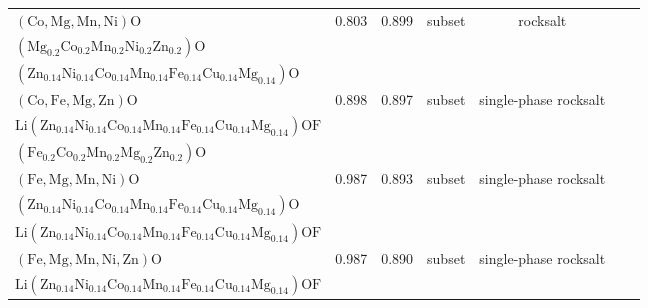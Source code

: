 \begin{table}
{\begin{tabular}{lcccccr}
$(\mathrm{Co},\mathrm{Mg},\mathrm{Mn},\mathrm{Ni})\mathrm{O}$ & 0.803 & 0.899 & subset & rocksalt & \makecell{$(\mathrm{Co},\mathrm{Fe},\mathrm{Mg},\mathrm{Mn},\mathrm{Ni})\mathrm{O}$\\
$(\mathrm{Mg}_{0.2}\mathrm{Co}_{0.2}\mathrm{Mn}_{0.2}\mathrm{Ni}_{0.2}\mathrm{Zn}_{0.2})\mathrm{O}$\\
$(\mathrm{Zn}_{0.14}\mathrm{Ni}_{0.14}\mathrm{Co}_{0.14}\mathrm{Mn}_{0.14}\mathrm{Fe}_{0.14}\mathrm{Cu}_{0.14}\mathrm{Mg}_{0.14})\mathrm{O}$}& ~\cite{Sivak_HighEntropy_PhysicalReviewLetters_2025,Hou_ReversibilityAnodes_NanoEnergy_2024,Lin_MechanochemicalSynthesis_JournalofMaterialsScience_2020} \\
$(\mathrm{Co},\mathrm{Fe},\mathrm{Mg},\mathrm{Zn})\mathrm{O}$ & 0.898 & 0.897 & subset & single-phase rocksalt & \makecell{$(\mathrm{Zn}_{0.14}\mathrm{Ni}_{0.14}\mathrm{Co}_{0.14}\mathrm{Mn}_{0.14}\mathrm{Fe}_{0.14}\mathrm{Cu}_{0.14}\mathrm{Mg}_{0.14})\mathrm{O}$\\
$\mathrm{Li}(\mathrm{Zn}_{0.14}\mathrm{Ni}_{0.14}\mathrm{Co}_{0.14}\mathrm{Mn}_{0.14}\mathrm{Fe}_{0.14}\mathrm{Cu}_{0.14}\mathrm{Mg}_{0.14})\mathrm{OF}$\\
$(\mathrm{Fe}_{0.2}\mathrm{Co}_{0.2}\mathrm{Mn}_{0.2}\mathrm{Mg}_{0.2}\mathrm{Zn}_{0.2})\mathrm{O}$} & ~\cite{Lin_MechanochemicalSynthesis_JournalofMaterialsScience_2020,Dey_RocksaltNanocrystals_JournaloftheAmericanChemicalSociety_2025} \\
$(\mathrm{Fe},\mathrm{Mg},\mathrm{Mn},\mathrm{Ni})\mathrm{O}$ & 0.987 & 0.893 & subset & single-phase rocksalt & \makecell{$(\mathrm{Co},\mathrm{Fe},\mathrm{Mg},\mathrm{Mn},\mathrm{Ni})\mathrm{O}$\\
$(\mathrm{Zn}_{0.14}\mathrm{Ni}_{0.14}\mathrm{Co}_{0.14}\mathrm{Mn}_{0.14}\mathrm{Fe}_{0.14}\mathrm{Cu}_{0.14}\mathrm{Mg}_{0.14})\mathrm{O}$\\
$\mathrm{Li}(\mathrm{Zn}_{0.14}\mathrm{Ni}_{0.14}\mathrm{Co}_{0.14}\mathrm{Mn}_{0.14}\mathrm{Fe}_{0.14}\mathrm{Cu}_{0.14}\mathrm{Mg}_{0.14})\mathrm{OF}$} &  ~\cite{Sivak_HighEntropy_PhysicalReviewLetters_2025,Lin_MechanochemicalSynthesis_JournalofMaterialsScience_2020,pu2023mg} \\
$(\mathrm{Fe},\mathrm{Mg},\mathrm{Mn},\mathrm{Ni},\mathrm{Zn})\mathrm{O}$ & 0.987 & 0.890 & subset & single-phase rocksalt & \makecell{$(\mathrm{Zn}_{0.14}\mathrm{Ni}_{0.14}\mathrm{Co}_{0.14}\mathrm{Mn}_{0.14}\mathrm{Fe}_{0.14}\mathrm{Cu}_{0.14}\mathrm{Mg}_{0.14})\mathrm{O}$\\
$\mathrm{Li}(\mathrm{Zn}_{0.14}\mathrm{Ni}_{0.14}\mathrm{Co}_{0.14}\mathrm{Mn}_{0.14}\mathrm{Fe}_{0.14}\mathrm{Cu}_{0.14}\mathrm{Mg}_{0.14})\mathrm{OF}$} & ~\cite{Lin_MechanochemicalSynthesis_JournalofMaterialsScience_2020} \\

\end{tabular}}
\end{table}

